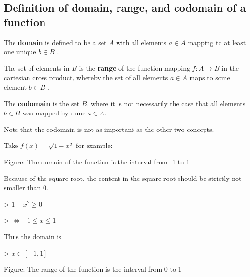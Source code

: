 \subsection{Definition of domain, range, and codomain of a function}
\label{sss:defi-62c6}




The \textbf{domain} is defined to be a set $A$ with all elements $a\in A$ mapping to at
least one unique $b\in B$ .



The set of elements in $B$ is the \textbf{range} of the function mapping $f:A\to B$ in the
cartesian cross product, whereby the set of all elements $a\in A$ maps to some element
$b\in B$ .



The \textbf{codomain} is the set $B$, where it is not necessarily the case that all
elements $b\in B$ was mapped by some $a\in A$.



Note that the codomain is not as important as the other two concepts.



Take $f(x)=\sqrt{1-x^2}$ for example:






Figure: The domain of the function is the interval from -1 to 1



Because of the square root, the content in the square root should be strictly not smaller than 0.



> $1-x^2\geq0$



> $\Leftrightarrow -1\leq x\leq 1$



Thus the domain is



> $x\in[-1,1]$






Figure: The range of the function is the interval from 0 to 1



